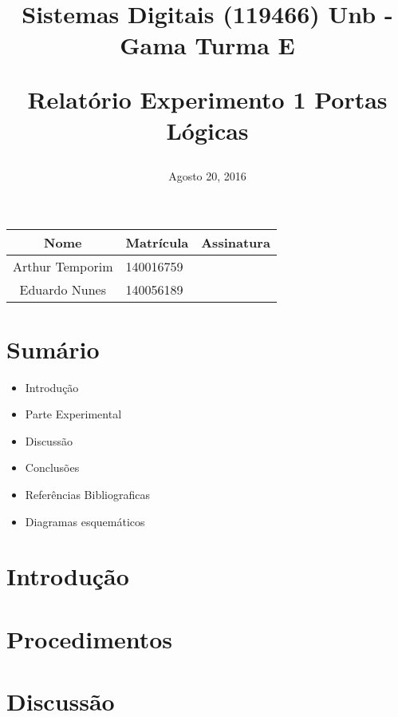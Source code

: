 \documentclass[12pts]{article}
\title{
	Sistemas Digitais (119466)
	Unb - Gama
	\singlespace
	Turma E
	\singlespacing
	\begin{midpage}
	\begin {large}
		Relatório Experimento 1
		\singlespace
		Portas Lógicas
	\end {large}
	\end{midpage}
}
\date{Agosto 20, 2016}
\begin{document}
\maketitle	
\begin{center}

\begin{tabular}{|c|l|r|}
\hline
Nome & Matrícula & Assinatura\\
\hline
Arthur Temporim & 140016759 & \\
\hline	
Eduardo Nunes & 140056189 & \\
\hline	
\end{tabular}

\end{center}


\newpage

\section{Sumário}

\begin{itemize}
	\item Introdução
	\singlespacing
	\item Parte Experimental
	\singlespacing
	\item Discussão
	\singlespacing
	\item Conclusões 
	\singlespacing
	\item Referências Bibliograficas
	\singlespacing
	\item Diagramas esquemáticos
\end{itemize}

\newpage


\section{Introdução}
\iffalse
Introdução, indicando a delimitação do tema, apresentando a justificativa descrevendo o propósito do relatório.
\fi

\section{Procedimentos}
\iffalse
Parte Experimental, descrevendo os passos realizados, dificuldades e soluções para os problemas encontrados. Aqui, deve-se apresentar uma descrição dos resultados encontrados em forma de figuras, gráficos e tabelas.
\fi

\section{Discussão}
\iffalse
Discussão sobre os resultados encontrados, comentando detalhadamente as medições realizadas e dando a devida interpretação destas, informando se os objetivos da experimento foram alcançados. Esta é uma das partes mais importantes do relatório: aqui, há oportunidade para expressar os conhecimentos adquiridos na prática e fazer a interrelação com os fundamentos teóricos.
\fi
\end{document}
